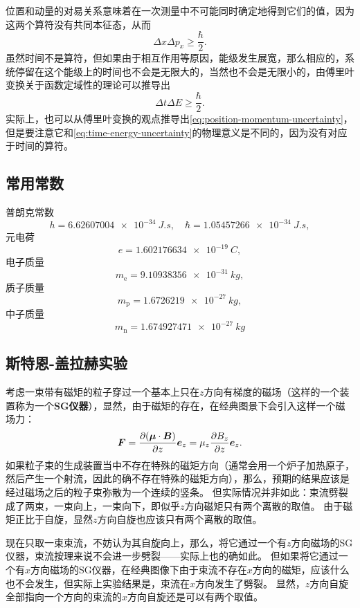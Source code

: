 \documentclass[UTF8, a4paper]{ctexart}
\begin{document}
位置和动量的对易关系意味着在一次测量中不可能同时确定地得到它们的值，因为这两个算符没有共同本征态，从而
\begin{equation}
    \Delta x \Delta p_x \geq \frac{\hbar}{2}.
    \label{eq:position-momentum-uncertainty}
\end{equation}
虽然时间不是算符，但如果由于相互作用等原因，能级发生展宽，那么相应的，系统停留在这个能级上的时间也不会是无限大的，当然也不会是无限小的，由傅里叶变换关于函数定域性的理论可以推导出
\begin{equation}
    \Delta t \Delta E \geq \frac{\hbar}{2}.
    \label{eq:time-energy-uncertainty}
\end{equation}
实际上，也可以从傅里叶变换的观点推导出\eqref{eq:position-momentum-uncertainty}，但是要注意它和\eqref{eq:time-energy-uncertainty}的物理意义是不同的，因为没有对应于时间的算符。

\subsection{常用常数}

普朗克常数
\[
    h = \SI{6.62607004e-34}{J.s}, \quad \hbar = \SI{1.05457266e-34}{J.s},
\]
元电荷
\[
    e = \SI{1.602176634e-19}{C},
\]
电子质量
\[
    m_\text{e} = \SI{9.10938356e-31}{kg},
\]
质子质量
\[
    m_\text{p} = \SI{1.6726219e-27}{kg},
\]
中子质量
\[
    m_\text{n} = \SI{1.674927471e-27}{kg}
\]

\subsection{斯特恩-盖拉赫实验}

考虑一束带有磁矩的粒子穿过一个基本上只在$z$方向有梯度的磁场（这样的一个装置称为一个\textbf{SG仪器}），显然，由于磁矩的存在，在经典图景下会引入这样一个磁场力：
\begin{equation}
    \vb*{F} = \pdv{(\vb*{\mu} \cdot \vb*{B})}{z} \vb*{e}_z = \mu_z \pdv{B_z}{z} \vb*{e}_z.
\end{equation}
如果粒子束的生成装置当中不存在特殊的磁矩方向（通常会用一个炉子加热原子，然后产生一个射流，因此的确不存在特殊的磁矩方向），那么，预期的结果应该是经过磁场之后的粒子束弥散为一个连续的竖条。
但实际情况并非如此：束流劈裂成了两束，一束向上，一束向下，即似乎$z$方向磁矩只有两个离散的取值。
由于磁矩正比于自旋，显然$z$方向自旋也应该只有两个离散的取值。

现在只取一束束流，不妨认为其自旋向上，那么，将它通过一个有$z$方向磁场的SG仪器，束流按理来说不会进一步劈裂——实际上也的确如此。
但如果将它通过一个有$x$方向磁场的SG仪器，在经典图像下由于束流不存在$x$方向的磁矩，应该什么也不会发生，但实际上实验结果是，束流在$x$方向发生了劈裂。
显然，$z$方向自旋全部指向一个方向的束流的$x$方向自旋还是可以有两个取值。
\end{document}

